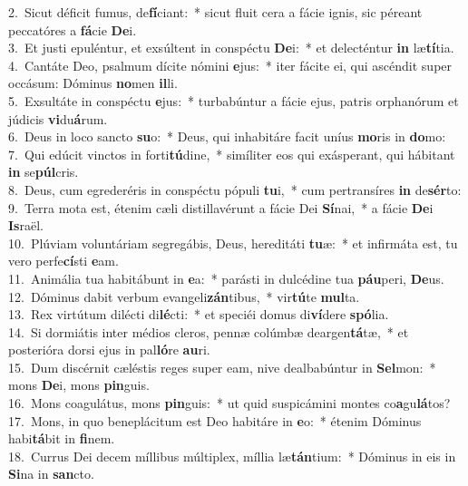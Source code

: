 {2.~}Sicut déficit fumus, de\textbf{fí}ciant:~* sicut fluit cera a fácie ignis, sic péreant peccatóres a \textbf{fá}cie \textbf{De}i.\\
{3.~}Et justi epuléntur, et exsúltent in conspéctu \textbf{De}i:~* et delecténtur \textbf{in} læ\textbf{tí}tia.\\
{4.~}Cantáte Deo, psalmum dícite nómini \textbf{e}jus:~* iter fácite ei, qui ascéndit super occásum: Dóminus \textbf{no}men \textbf{il}li.\\
{5.~}Exsultáte in conspéctu \textbf{e}jus:~* turbabúntur a fácie ejus, patris orphanórum et júdicis \textbf{vi}du\textbf{á}rum.\\
{6.~}Deus in loco sancto \textbf{su}o:~* Deus, qui inhabitáre facit uníus \textbf{mo}ris in \textbf{do}mo:\\
{7.~}Qui edúcit vinctos in forti\textbf{tú}dine,~* simíliter eos qui exásperant, qui hábitant \textbf{in} se\textbf{púl}cris.\\
{8.~}Deus, cum egrederéris in conspéctu pópuli \textbf{tu}i,~* cum pertransíres \textbf{in} de\textbf{sér}to:\\
{9.~}Terra mota est, étenim cæli distillavérunt a fácie Dei \textbf{Sí}nai,~* a fácie \textbf{De}i \textbf{Is}raël.\\
{10.~}Plúviam voluntáriam segregábis, Deus, hereditáti \textbf{tu}æ:~* et infirmáta est, tu vero perfe\textbf{cí}sti \textbf{e}am.\\
{11.~}Animália tua habitábunt in \textbf{e}a:~* parásti in dulcédine tua \textbf{páu}peri, \textbf{De}us.\\
{12.~}Dóminus dabit verbum evangeli\textbf{zán}tibus,~* vir\textbf{tú}te \textbf{mul}ta.\\
{13.~}Rex virtútum dilécti di\textbf{lé}cti:~* et speciéi domus di\textbf{ví}dere \textbf{spó}lia.\\
{14.~}Si dormiátis inter médios cleros, pennæ colúmbæ deargen\textbf{tá}tæ,~* et posterióra dorsi ejus in pal\textbf{ló}re \textbf{au}ri.\\
{15.~}Dum discérnit cæléstis reges super eam, nive dealbabúntur in \textbf{Sel}mon:~* mons \textbf{De}i, mons \textbf{pin}guis.\\
{16.~}Mons coagulátus, mons \textbf{pin}guis:~* ut quid suspicámini montes co\textbf{a}gu\textbf{lá}tos?\\
{17.~}Mons, in quo beneplácitum est Deo habitáre in \textbf{e}o:~* étenim Dóminus habi\textbf{tá}bit in \textbf{fi}nem.\\
{18.~}Currus Dei decem míllibus múltiplex, míllia læ\textbf{tán}tium:~* Dóminus in eis in \textbf{Si}na in \textbf{san}cto.\\
